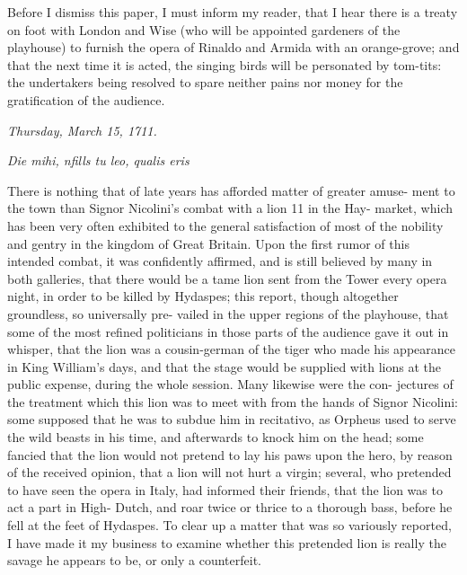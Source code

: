 Before I dismiss this paper, I must inform my reader, that I hear there is a treaty on foot with London and Wise (who will be appointed gardeners of the playhouse) to furnish the opera of Rinaldo and Armida with an orange-grove; and that the next time it is acted, the singing birds will be personated by tom-tits: the undertakers being resolved to spare neither pains nor money for the gratification of the audience.

\begin{center}
    \emph{Thursday, March 15, 1711.}

    \emph{Die mihi, nfills tu leo, qualis eris}
\end{center}

There is nothing that of late years has afforded matter of greater amuse- ment to the town than Signor Nicolini's combat with a lion 11 in the Hay- market, which has been very often exhibited to the general satisfaction of most of the nobility and gentry in the kingdom of Great Britain. Upon the first rumor of this intended combat, it was confidently affirmed, and is still believed by many in both galleries, that there would be a tame lion sent from the Tower every opera night, in order to be killed by Hydaspes; this report, though altogether groundless, so universally pre- vailed in the upper regions of the playhouse, that some of the most refined politicians in those parts of the audience gave it out in whisper, that the lion was a cousin-german of the tiger who made his appearance in King William's days, and that the stage would be supplied with lions at the public expense, during the whole session. Many likewise were the con- jectures of the treatment which this lion was to meet with from the hands of Signor Nicolini: some supposed that he was to subdue him in recitativo, as Orpheus used to serve the wild beasts in his time, and afterwards to knock him on the head; some fancied that the lion would not pretend to lay his paws upon the hero, by reason of the received opinion, that a lion will not hurt a virgin; several, who pretended to have seen the opera in Italy, had informed their friends, that the lion was to act a part in High- Dutch, and roar twice or thrice to a thorough bass, before he fell at the feet of Hydaspes. To clear up a matter that was so variously reported, I have made it my business to examine whether this pretended lion is really the savage he appears to be, or only a counterfeit.


